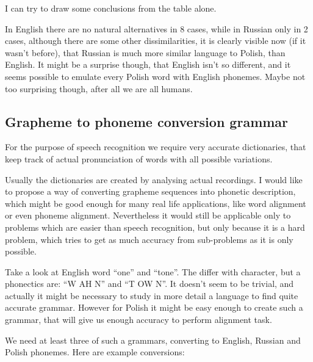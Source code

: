 \documentclass[12pt,a4paper,english]{article}
\begin{document}
I can try to draw some conclusions from the table alone. \newline

In English there are no natural alternatives in 8 cases, while in Russian only in 2 cases, although there are some other dissimilarities, it is clearly visible now (if it wasn't before), that Russian is much more similar language to Polish, than English. \newline
It might be a surprise though, that English isn't so different, and it seems possible to emulate every Polish word with English phonemes.
Maybe not too surprising though, after all we are all humans.

\newpage
\subsection{Grapheme to phoneme conversion grammar}

For the purpose of speech recognition we require very accurate dictionaries, that keep track of actual pronunciation of words with all possible variations. \newline

Usually the dictionaries are created by analysing actual recordings. \newline
I would like to propose a way of converting grapheme sequences into phonetic description, which might be good enough for many real life applications, like word alignment or even phoneme alignment. \newline
Nevertheless it would still be applicable only to problems which are easier than speech recognition, but only because it is a hard problem, which tries to get as much accuracy from sub-problems as it is only possible. \newline

Take a look at English  word “one” and “tone”. The differ with character, but a phonectics are: “W AH N”  and “T OW N”.  \newline
It doesn't seem to be trivial, and actually it might be necessary to study in more detail a language to find quite accurate grammar. However for Polish it might be easy enough to create such a grammar, that will give us enough accuracy to perform alignment task. \newline

We need at least three of such a grammars, converting to English, Russian and Polish phonemes. \newline
 Here are example conversions:
\end{document}
